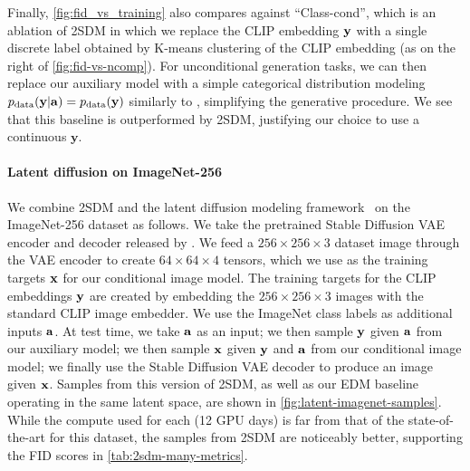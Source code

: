 Finally, \cref{fig:fid_vs_training} also compares against ``Class-cond'', which is an ablation of 2SDM in which we replace the CLIP embedding ${\mathbf{y}}$ with a single discrete label obtained by K-means clustering of the CLIP embedding (as on the right of \cref{fig:fid-vs-ncomp}). For unconditional generation tasks, we can then replace our auxiliary model with a simple categorical distribution modeling $p_{\rm{data}}({\mathbf{y}}|{\mathbf{a}})=p_{\rm{data}}({\mathbf{y}})$ similarly to \citet{hu2022self}, simplifying the generative procedure. We see that this baseline is outperformed by 2SDM, justifying our choice to use a continuous $\mathbf{y}$.


\paragraph{Latent diffusion on ImageNet-256}
We combine 2SDM and the latent diffusion modeling framework~\citep{rombach2022high} on the ImageNet-256 dataset as follows. We take the pretrained Stable Diffusion VAE encoder and decoder released by \citet{rombach2022high}. We feed a $256\times256\times3$ dataset image through the VAE encoder to create $64\times64\times4$ tensors, which we use as the training targets ${\mathbf{x}}$ for our conditional image model. The training targets for the CLIP embeddings ${\mathbf{y}}$ are created by embedding the $256\times256\times3$ images with the standard CLIP image embedder. We use the ImageNet class labels as additional inputs ${\mathbf{a}}$. At test time, we take ${\mathbf{a}}$ as an input; we then sample ${\mathbf{y}}$ given ${\mathbf{a}}$ from our auxiliary model; we then sample ${\mathbf{x}}$ given ${\mathbf{y}}$ and ${\mathbf{a}}$ from our conditional image model; we finally use the Stable Diffusion VAE decoder to produce an image given ${\mathbf{x}}$. Samples from this version of 2SDM, as well as our EDM baseline operating in the same latent space, are shown in \cref{fig:latent-imagenet-samples}. While the compute used for each (12 GPU days) is far from that of the state-of-the-art for this dataset, the samples from 2SDM are noticeably better, supporting the FID scores in \cref{tab:2sdm-many-metrics}.

